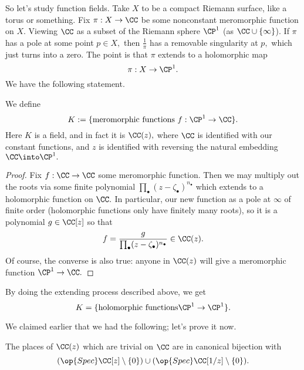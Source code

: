 \documentclass[../notes.tex]{subfiles}
\begin{document}
So let's study function fields. Take $X$ to be a compact Riemann surface, like a torus or something. Fix $\pi:X\to\CC$ be some nonconstant meromorphic function on $X.$ Viewing $\CC$ as a subset of the Riemann sphere $\CP^1$ (as $\CC\cup\{\infty\}$). If $\pi$ has a pole at some point $p\in X,$ then $\frac1\pi$ has a removable singularity at $p,$ which just turns into a zero. The point is that $\pi$ extends to a holomorphic map
\[\pi:X\to\CP^1.\]
We have the following statement.
\begin{proposition}
	We define
	\[K:=\{\text{meromorphic functions }f:\CP^1\to\CC\}.\]
	Here $K$ is a field, and in fact it is $\CC(z),$ where $\CC$ is identified with our constant functions, and $z$ is identified with reversing the natural embedding $\CC\into\CP^1.$
\end{proposition}
\begin{proof}
	Fix $f:\CC\to\CC$ some meromorphic function. Then we may multiply out the roots via some finite polynomial $\prod_\bullet(z-\zeta_\bullet)^{n_\bullet}$ which extends to a holomorphic function on $\CC.$ In particular, our new function as a pole at $\infty$ of finite order (holomorphic functions only have finitely many roots), so it is a polynomial $g\in\CC[z]$ so that
	\[f=\frac g{\prod_\bullet(z-\zeta_\bullet)^{n_\bullet}}\in\CC(z).\]
	Of course, the converse is also true: anyone in $\CC(z)$ will give a meromorphic function $\CP^1\to\CC.$
\end{proof}
\begin{remark}
	By doing the extending process described above, we get
	\[K=\{\text{holomorphic functions}\CP^1\to\CP^1\}.\]
\end{remark}
We claimed earlier that we had the following; let's prove it now.
\begin{proposition}
	The places of $\CC(z)$ which are trivial on $\CC$ are in canonical bijection with
	\[(\op{Spec}\CC[z]\setminus\{0\})\cup(\op{Spec}\CC[1/z]\setminus\{0\}).\]
\end{proposition}
\end{document}
